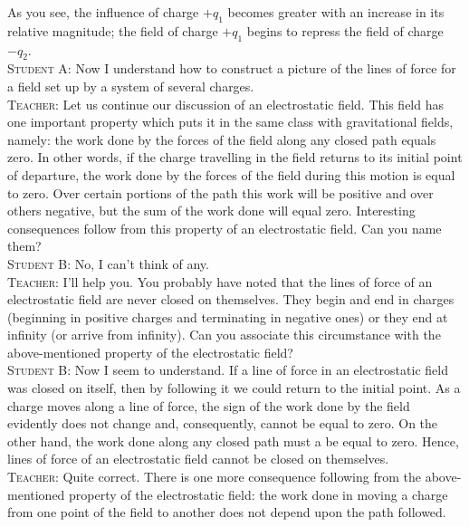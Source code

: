 \documentclass[a4paper,sfsidenotes]{tufte-book}
\begin{document}
As you see, the influence of charge $+q_{1}$ becomes greater with an increase in its relative magnitude; the field of charge $+q_{1}$ begins to repress the field of charge $-q_{2}$.
\\
\textsc{Student A:} Now I understand how to construct a picture of the lines of force for a field set up by a system of several charges.
\\
\textsc{Teacher:} Let us continue our discussion of an electrostatic field. This field has one important property which puts it in the same class with gravitational fields, namely: the work done by the forces of the field along any closed path equals zero. In other words, if the charge travelling in the field returns to its initial point of departure, the work done by the forces of the field during this motion is equal to zero. Over certain portions of the path this work will be positive and over others negative, but the sum of the work done will equal zero. Interesting consequences follow from this property of an electrostatic field. Can you name them?
\\
\textsc{Student B:} No, I can't think of any.
\\
\textsc{Teacher:} I'll help you. You probably have noted that the lines of force of an electrostatic field are never closed on themselves. They begin and end in charges (beginning in positive charges and terminating in negative ones) or they end at infinity (or arrive from infinity). Can you associate this circumstance with the above-mentioned property of the electrostatic field?
\\
\textsc{Student B:} Now I seem to understand. If a line of force in an electrostatic field was closed on itself, then by following it we could return to the initial point. As a charge moves along a line of force, the sign of the work done by the field evidently does not change and, consequently, cannot be equal to zero. On the other hand, the work done along any closed path must a be equal to zero. Hence, lines of force of an electrostatic field cannot be closed on themselves.
\\
\textsc{Teacher:} Quite correct. There is one more consequence following from the above-mentioned property of the electrostatic field: the work done in moving a charge from one point of the field to another does not depend upon the path followed.
\end{document}
